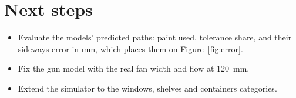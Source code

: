 \documentclass[10pt]{article}
\begin{document}
\section*{Next steps}
\begin{itemize}\itemsep0pt
\item Evaluate the models' predicted paths: paint used, tolerance share, and their sideways
      error in mm, which places them on Figure~\ref{fig:error}.
\item Fix the gun model with the real fan width and flow at \SI{120}{mm}.
\item Extend the simulator to the
      windows, shelves and containers categories.
\end{itemize}
\end{document}
